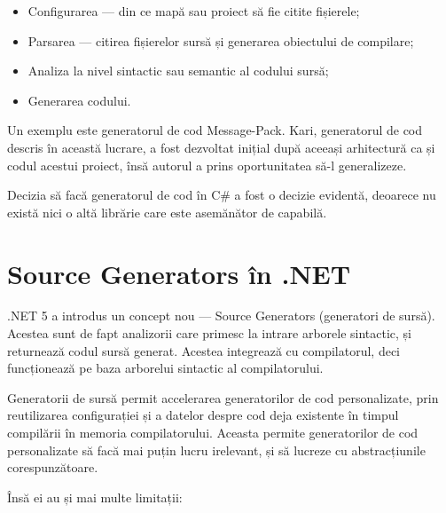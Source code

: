 \documentclass[a4paper,12pt]{report}
\begin{document}
\begin{itemize}
  \item Configurarea --- din ce mapă sau proiect să fie citite fișierele;
  \item Parsarea --- citirea fișierelor sursă și generarea obiectului de compilare;
  \item Analiza la nivel sintactic sau semantic al codului sursă;
  \item Generarea codului.
\end{itemize}

Un exemplu este generatorul de cod Message-Pack\cite{message_pack_github}.
Kari, generatorul de cod descris în această lucrare, a fost dezvoltat inițial după aceeași arhitectură ca și codul acestui proiect, însă autorul a prins oportunitatea să-l generalizeze.

Decizia să facă generatorul de cod în C\# a fost o decizie evidentă, deoarece nu există nici o altă librărie care este asemănător de capabilă.

\section{Source Generators în {{.}NET}}

{{.}NET} 5 a introdus un concept nou --- Source Generators (generatori de sursă)\cite{source_generators}.
Acestea sunt de fapt analizorii care primesc la intrare arborele sintactic, și returnează codul sursă generat.
Acestea integrează cu compilatorul, deci funcționează pe baza arborelui sintactic al compilatorului.

Generatorii de sursă permit accelerarea generatorilor de cod personalizate, prin reutilizarea configurației și a datelor despre cod deja existente în timpul compilării în memoria compilatorului.
Aceasta permite generatorilor de cod personalizate să facă mai puțin lucru irelevant, și să lucreze cu abstracțiunile corespunzătoare.

Însă ei au și mai multe limitații:
\end{document}
